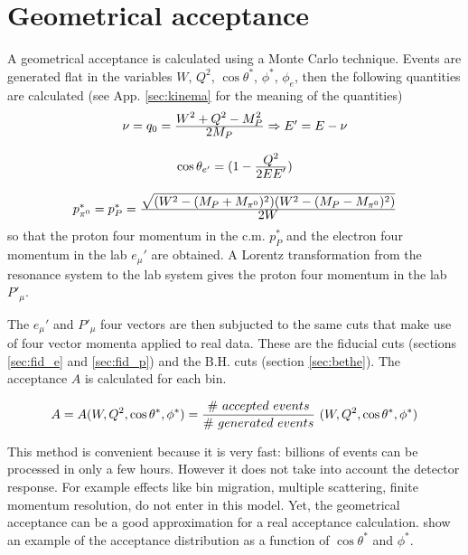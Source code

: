 \section{Geometrical acceptance}
A geometrical acceptance is calculated using a Monte Carlo technique.
Events are generated flat in the variables $W$, $Q^2$, $\cos\theta^*$, $\phi^*$, $\phi_e$,
then the following quantities are calculated (see App. \ref{sec:kinema} for the meaning 
of the quantities)
\begin{equation}
\begin{array}{c}
 \nu = q_0 = \frac{\displaystyle W^2 + Q^2 - M_P^2}{\displaystyle 2M_P} \Rightarrow E' = E - \nu\\ \\
 \cos\theta_{e'} = (1-\frac{\displaystyle Q^2}{\displaystyle 2EE'}) \\ \\ 
 p_{\pi^0}^* = p_P^* = \frac{\displaystyle \sqrt{ ( W^2 - (M_P + M_{\pi^0})^2 )
                                     ( W^2 - (M_P - M_{\pi^0})^2 ) }}{\displaystyle 2W}
\end{array}
\end{equation}
so that the proton four momentum in the c.m. $p_P^*$ and the electron four momentum in the lab $e_{\mu}'$ are obtained.
A Lorentz transformation from the resonance system to the lab system gives the proton four momentum in 
the lab $P'_{\mu}$. 

The $e_{\mu}'$ and $P'_{\mu}$ four vectors are then subjucted to the same cuts that make
use of four vector momenta applied to real data. These are the fiducial cuts 
(sections \ref{sec:fid_e} and  \ref{sec:fid_p}) 
and the B.H. cuts (section \ref{sec:bethe}). The acceptance $A$ is calculated for each bin.

\begin{equation}
 A = A(W, Q^2, \cos\theta^*, \phi^*) = \frac{\displaystyle \# \,\,accepted \,\,events}{\displaystyle \# \,\, generated  \,\, events}\,\,(W, Q^2, \cos\theta^*, \phi^*)
\end{equation}					     

This method is convenient because it is very fast: billions of events can be processed in only a few hours.
However it does not take into account
the detector response. For example effects like bin migration, multiple scattering, finite
momentum resolution, do not enter in this model. Yet, the geometrical acceptance can
be a good approximation for a real acceptance calculation.
 show an example of the acceptance distribution as a function of $\cos\theta^*$ and $\phi^*$. 

